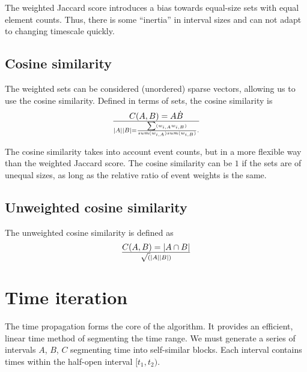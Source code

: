 \documentclass{article}
\begin{document}
The weighted Jaccard score introduces a bias towards equal-size sets
with equal element counts.  Thus, there is some ``inertia'' in
interval sizes and can not adapt to changing timescale quickly.

\subsection{Cosine similarity}
The weighted sets can be considered (unordered) sparse vectors,
allowing us to use the cosine similarity.  Defined in terms of sets, the
cosine similarity is
\begin{equation}
  C(A,B)
    = {A \dot B} \over { |A| |B| }
    = {{ \sum(w_{i,A}  w_{i,B}) }    \over   { sum(w_{i,A}) sum(w_{i,B}) }}.
\end{equation}

The cosine similarity takes into account event counts, but in a more
flexible way than the weighted Jaccard score.  The cosine similarity can
be $1$ if the sets are of unequal sizes, as long as the relative
ratio of event weights is the same.


\subsection{Unweighted cosine similarity}
The unweighted cosine similarity is defined as
\begin{equation}
  C(A,B) = {|A \cap B|} \over {\sqrt( |A| |B| )}
\end{equation}





\section{Time iteration}
\label{sec:meth-time}
The time propagation forms the core of the algorithm.  It provides an
efficient, linear time method of segmenting the time range.  We must
generate a series of intervals $A$, $B$, $C$ segmenting time into
self-similar blocks.  Each interval contains times within the
half-open interval $[t_1, t_2)$.
\end{document}
